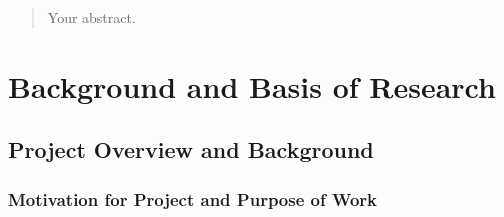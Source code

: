\documentclass[12pt,twoside]{report}
\date{September 2019}
\begin{document}



\clearpage{\pagestyle{empty}\cleardoublepage}
\setcounter{page}{1}
\pagestyle{fancy}

\begin{abstract}
Your abstract.
\end{abstract}

\clearpage


\tableofcontents 


\clearpage{\pagestyle{empty}\cleardoublepage}
\setcounter{page}{1}
\fancyhead[LE,RO]{\slshape \rightmark}
\fancyhead[LO,RE]{\slshape \leftmark}













\part{Background and Basis of Research}


\chapter{Project Overview and Background\\}


\section{Motivation for Project and Purpose of Work}
\end{document}

